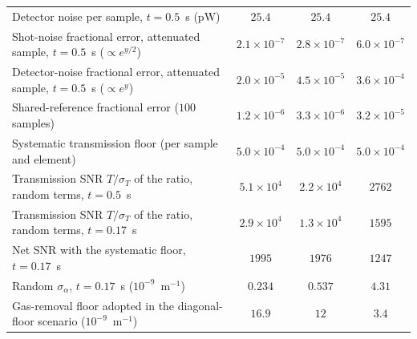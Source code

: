 \begin{table}[t]
\begin{tabular}{lccc}
Detector noise per sample, $t=0.5$~s (pW) & $25.4$ & $25.4$ & $25.4$ \\
Shot-noise fractional error, attenuated sample, $t=0.5$~s ($\propto e^{y/2}$) & $2.1\times10^{-7}$ & $2.8\times10^{-7}$ & $6.0\times10^{-7}$ \\
Detector-noise fractional error, attenuated sample, $t=0.5$~s ($\propto e^{y}$) & $2.0\times10^{-5}$ & $4.5\times10^{-5}$ & $3.6\times10^{-4}$ \\
Shared-reference fractional error ($100$ samples) & $1.2\times10^{-6}$ & $3.3\times10^{-6}$ & $3.2\times10^{-5}$ \\
Systematic transmission floor (per sample and element) & $5.0\times10^{-4}$ & $5.0\times10^{-4}$ & $5.0\times10^{-4}$ \\
Transmission SNR $T/\sigma_T$ of the ratio, random terms, $t=0.5$~s & $5.1\times10^{4}$ & $2.2\times10^{4}$ & $2762$ \\
Transmission SNR $T/\sigma_T$ of the ratio, random terms, $t=0.17$~s & $2.9\times10^{4}$ & $1.3\times10^{4}$ & $1595$ \\
Net SNR with the systematic floor, $t=0.17$~s & $1995$ & $1976$ & $1247$ \\
Random $\sigma_\alpha$, $t=0.17$~s ($10^{-9}$~m$^{-1}$) & $0.234$ & $0.537$ & $4.31$ \\
Gas-removal floor adopted in the diagonal-floor scenario ($10^{-9}$~m$^{-1}$) & $16.9$ & $12$ & $3.4$ \\
\bottomrule
\end{tabular}
\end{table}
